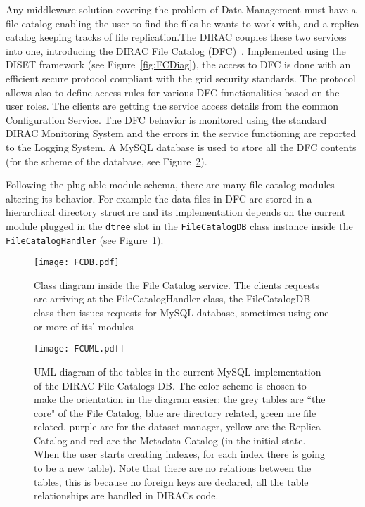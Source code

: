 Any middleware solution covering the problem of Data Management must have a file catalog enabling the user to  
find the files he wants to work with, and a replica catalog keeping tracks of file replication.The DIRAC 
couples these two services into one, introducing the DIRAC File Catalog (DFC)~\cite{DFC}. 
Implemented using the DISET framework (see Figure~\ref{fig:FCDiag}), the access to DFC is done with an efficient secure 
protocol compliant with the grid security standards.
The protocol allows also to define access rules for various DFC functionalities based on the user roles. The
clients are getting the service access details from the common Configuration Service. The DFC behavior
is monitored using the standard DIRAC Monitoring System and the errors in the service functioning are
reported to the Logging System. A MySQL database is used to store all the DFC contents (for the scheme of the 
database, see Figure~\ref{fig:FCMySQLUML}). 

Following the plug-able module schema, there are many file catalog modules altering its behavior. For example the 
data files in DFC are stored in a hierarchical directory structure and its implementation depends on the current
module plugged in the \texttt{dtree} slot in the \texttt{FileCatalogDB} class instance inside the 
\texttt{FileCatalogHandler} (see Figure~\ref{fig:FCClasses}). 

\begin{figure}[h]
	\centering
	\texttt{[image: FCDB.pdf]}
	\caption{Class diagram inside the File Catalog service. The clients requests are arriving at the 
	FileCatalogHandler class, the FileCatalogDB class then issues requests for MySQL database, sometimes using one
	or more of its' modules}
	\label{fig:FCClasses}
\end{figure}

\begin{figure}[b]
	\centering
	\texttt{[image: FCUML.pdf]}
	\caption{UML diagram of the tables in the current MySQL implementation of the DIRAC File Catalogs DB. The color 
	scheme is chosen to make the orientation in the diagram easier: the grey tables are ``the core" of the File Catalog, blue are
	directory related, green are file related, purple are for the dataset manager, yellow are the Replica Catalog
	and red are the Metadata Catalog (in the initial state. When the user starts creating indexes, for each 
	index there is going to be a new table). Note that there are no relations between the tables, this is because
	no foreign keys are declared, all the table relationships are handled in DIRACs code.}
	\label{fig:FCMySQLUML}
\end{figure}

